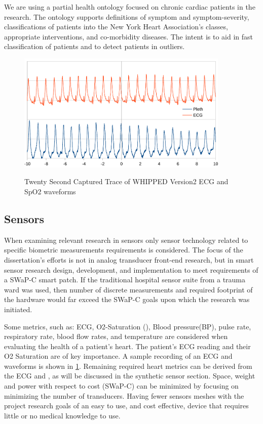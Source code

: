 We are using a partial health ontology focused on chronic cardiac patients in the research. The ontology supports definitions of symptom and symptom-severity, classifications of patients into the New York Heart Association's classes, appropriate interventions, and co-morbidity diseases. The intent is to aid in fast classification of patients and to detect patients in outliers.


\begin{figure}
	\begin{center}
		\label{fig:20SecondEcg}
		\includegraphics[scale=1,width=0.9\textwidth]{Images/20second.pdf} 
		\caption{Twenty Second Captured Trace of WHIPPED Version2 ECG and SpO2 waveforms}
	\end{center}
\end{figure}


\subsection{Sensors}
\label{subsec:Sensors}
When examining relevant research in sensors only sensor technology related to specific biometric measurements requirements is considered. The focus of the dissertation's efforts is not in analog transducer front-end research, but in smart sensor research design, development, and implementation to meet requirements of a SWaP-C smart patch. If the traditional hospital sensor suite from a trauma ward was used, then number of discrete measurements and required footprint of the hardware would far exceed the SWaP-C goals upon which the research was initiated.

Some metrics, such as: ECG, O2-Saturation (), Blood pressure(BP), pulse rate, respiratory rate, blood flow rates, and temperature are considered when evaluating the health of a patient's heart. The patient's ECG reading and their O2 Saturation are of key importance. A sample recording of an ECG and  waveforms is shown in \ref{fig:20SecondEcg}. Remaining required heart metrics can be derived from the ECG and , as will be discussed in the synthetic sensor section. Space, weight and power with respect to cost (SWaP-C) can be minimized by focusing on minimizing the number of transducers. Having fewer sensors meshes with the project research goals of an easy to use, and cost effective, device that requires little or no medical knowledge to use.

